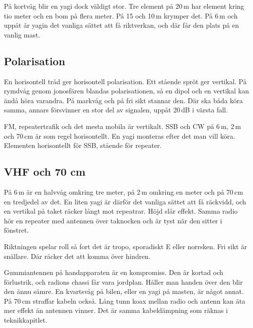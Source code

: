 På kortvåg blir en yagi dock väldigt stor. Tre element på 20\,m har
element kring tio meter och en bom på flera meter. På 15 och 10\,m
krymper det. På 6\,m och uppåt är yagin det vanliga sättet att få
riktverkan, och där får den plats på en vanlig mast.

\subsection{Polarisation}

En horisontell tråd ger horisontell polarisation. Ett stående spröt
ger vertikal. På rymdvåg genom jonosfären blandas polarisationen, så
en dipol och en vertikal kan ändå höra varandra. På markvåg och på fri
sikt stannar den. Där ska båda köra samma, annars försvinner en stor
del av signalen, uppåt 20\,dB i värsta fall.

FM, repeatertrafik och det mesta mobila är vertikalt. SSB och CW på
6\,m, 2\,m och 70\,cm är som regel horisontellt. En yagi monteras
efter det man vill köra. Elementen horisontellt för SSB, stående för
repeater.

\subsection{VHF och 70 cm}
\label{sec:vhf-antenn}
\index{70 cm}

På 6\,m är en halvvåg omkring tre meter, på 2\,m omkring en meter och
på 70\,cm en tredjedel av det. En liten yagi är därför det vanliga
sättet att få räckvidd, och en vertikal på taket räcker långt mot
repeatrar. Höjd slår effekt. Samma radio hör en repeater med antennen
över taknocken och är tyst när den sitter i fönstret.

Riktningen spelar roll så fort det är tropo, sporadiskt E eller
norrsken. Fri sikt är snällare. Där räcker det att komma över hindren.

Gummiantennen på handapparaten är en kompromiss. Den är kortad och
förlustrik, och radions chassi får vara jordplan. Håller man handen
över den blir den ännu sämre. En kvartsvåg på bilen, eller en yagi på
masten, är något annat. På 70\,cm straffar kabeln också. Lång tunn
koax mellan radio och antenn kan äta mer effekt än antennen
vinner. Det är samma kabeldämpning som räknas i teknikkapitlet.

